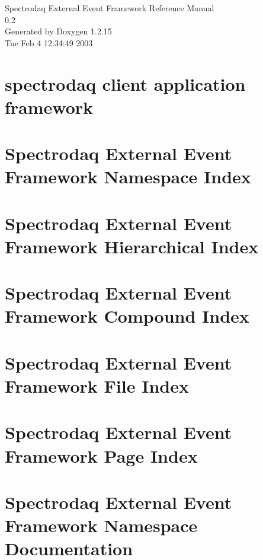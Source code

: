 \documentclass[letterpaper]{book}
\begin{document}
\begin{titlepage}
\vspace*{7cm}
\begin{center}
{\Large Spectrodaq External Event Framework Reference Manual\\[1ex]\large 0.2}\\
\vspace*{1cm}
{\large Generated by Doxygen 1.2.15}\\
\vspace*{0.5cm}
{\small Tue Feb 4 12:34:49 2003}\\
\end{center}
\end{titlepage}
\clearemptydoublepage
{}
\tableofcontents
\clearemptydoublepage
{}
\chapter{spectrodaq client application framework}
\label{index}
\chapter{Spectrodaq External Event Framework Namespace Index}

\chapter{Spectrodaq External Event Framework Hierarchical Index}

\chapter{Spectrodaq External Event Framework Compound Index}

\chapter{Spectrodaq External Event Framework File Index}

\chapter{Spectrodaq External Event Framework Page Index}

\chapter{Spectrodaq External Event Framework Namespace Documentation}

\end{document}
